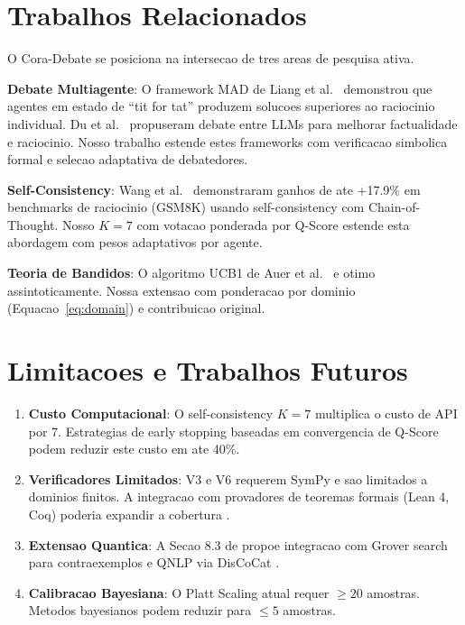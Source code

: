 \documentclass[5p]{elsarticle}
\begin{document}
\section{Trabalhos Relacionados}

O Cora-Debate se posiciona na intersecao de tres areas de pesquisa ativa.

\textbf{Debate Multiagente}: O framework MAD de Liang et al.\ \cite{liang2023} demonstrou que agentes em estado de ``tit for tat'' produzem solucoes superiores ao raciocinio individual. Du et al.\ \cite{du2023} propuseram debate entre LLMs para melhorar factualidade e raciocinio. Nosso trabalho estende estes frameworks com verificacao simbolica formal e selecao adaptativa de debatedores.

\textbf{Self-Consistency}: Wang et al.\ \cite{wang2023} demonstraram ganhos de ate +17.9\% em benchmarks de raciocinio (GSM8K) usando self-consistency com Chain-of-Thought. Nosso $K=7$ com votacao ponderada por Q-Score estende esta abordagem com pesos adaptativos por agente.

\textbf{Teoria de Bandidos}: O algoritmo UCB1 de Auer et al.\ \cite{auer2002} e otimo assintoticamente. Nossa extensao com ponderacao por dominio (Equacao~\ref{eq:domain}) e contribuicao original.

\section{Limitacoes e Trabalhos Futuros}

\begin{enumerate}
\item \textbf{Custo Computacional}: O self-consistency $K=7$ multiplica o custo de API por 7. Estrategias de early stopping baseadas em convergencia de Q-Score podem reduzir este custo em ate 40\%.
\item \textbf{Verificadores Limitados}: V3 e V6 requerem SymPy e sao limitados a dominios finitos. A integracao com provadores de teoremas formais (Lean 4, Coq) poderia expandir a cobertura \cite{demoura2021}.
\item \textbf{Extensao Quantica}: A Secao 8.3 de \cite{cora2026} propoe integracao com Grover search para contraexemplos \cite{grover1996} e QNLP via DisCoCat \cite{coecke2010}.
\item \textbf{Calibracao Bayesiana}: O Platt Scaling atual requer $\geq 20$ amostras. Metodos bayesianos \cite{kuleshov2018} podem reduzir para $\leq 5$ amostras.
\end{enumerate}
\end{document}
